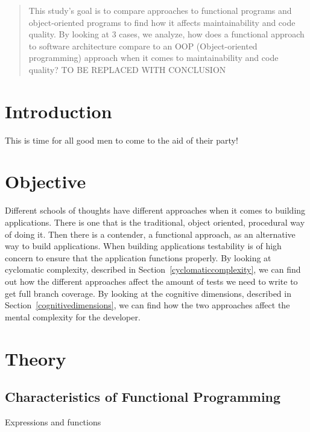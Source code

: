 \documentclass[12pt]{article}
\theoremstyle{definition}
\theoremstyle{theorem}
\begin{document}
\maketitle

\begin{abstract} 

    This study's goal is to compare approaches to functional programs and
    object-oriented programs to find how it affects maintainability and code
    quality. By looking at 3 cases, we analyze, how does a functional approach
    to software architecture compare to an OOP (Object-oriented programming)
    approach when it comes to maintainability and code quality? TO BE REPLACED
    WITH CONCLUSION

\end{abstract}

\section{Introduction}
This is time for all good men to come to the aid of their party!

\section{Objective}

Different schools of thoughts have different approaches when it comes to
building applications. There is one that is the traditional, object oriented,
procedural way of doing it. Then there is a contender, a functional approach, as
an alternative way to build applications. When building applications testability
is of high concern to ensure that the application functions properly. By looking
at cyclomatic complexity, described in Section~\ref{cyclomaticcomplexity}, we
can find out how the different approaches affect the amount of tests we need to
write to get full branch coverage. By looking at the cognitive dimensions,
described in Section~\ref{cognitivedimensions}, we can find how the two
approaches affect the mental complexity for the developer. 


\section{Theory}\label{theory}

\subsection{Characteristics of Functional Programming}
Expressions and functions
\end{document}
